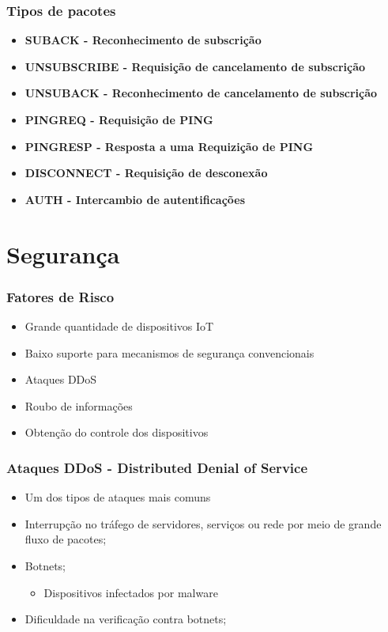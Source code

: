 \documentclass[12pt]{beamer}
\begin{document}
\begin{frame}[allowframebreaks]
    \frametitle{Tipos de pacotes}
    \begin{itemize}
    		\item \textbf{SUBACK - Reconhecimento de subscrição}
    		\item \textbf{UNSUBSCRIBE - Requisição de cancelamento de subscrição}
    		\item \textbf{UNSUBACK - Reconhecimento de cancelamento de subscrição}
    		\item \textbf{PINGREQ - Requisição de PING}
    		\item \textbf{PINGRESP - Resposta a uma Requizição de PING}
    		\item \textbf{DISCONNECT - Requisição de desconexão}
    		\item \textbf{AUTH - Intercambio de autentificações}
    \end{itemize}
\end{frame}

\section{Segurança}\label{Segurança}

\begin{frame}
    \frametitle{Fatores de Risco}
    \begin{itemize}
        \item Grande quantidade de dispositivos IoT
        \item Baixo suporte para mecanismos de segurança convencionais
        \item Ataques DDoS
        \item Roubo de informações
        \item Obtenção do controle dos dispositivos
    \end{itemize}
        
\end{frame}

\begin{frame}
    \frametitle{Ataques DDoS - Distributed Denial of Service}
    \begin{itemize}
        \item Um dos tipos de ataques mais comuns
        \item Interrupção no tráfego de servidores, serviços ou rede por meio de grande fluxo de pacotes;
        \item Botnets;
                \begin{itemize}
                \item Dispositivos infectados por malware
            \end{itemize}
        \item Dificuldade na verificação contra botnets;
    \end{itemize}
\end{frame}
\end{document}
